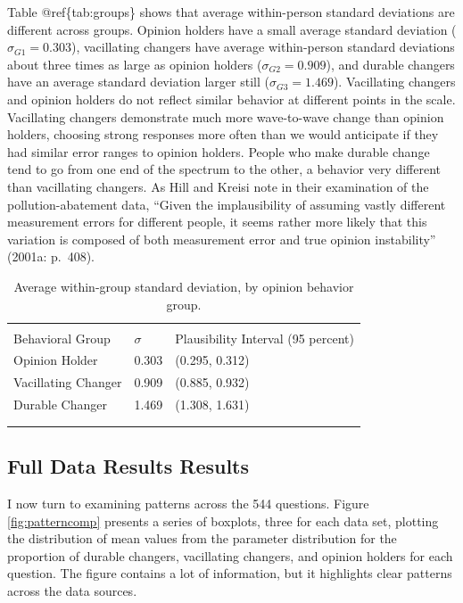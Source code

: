 \documentclass[12pt,]{article}
\begin{document}
Table @ref\{tab:groups\} shows that average within-person standard deviations are different across groups. Opinion holders have a small average standard deviation (\(\sigma_{G1} = 0.303\)), vacillating changers have average within-person standard deviations about three times as large as opinion holders (\(\sigma_{G2} = 0.909\)), and durable changers have an average standard deviation larger still (\(\sigma_{G3} = 1.469\)). Vacillating changers and opinion holders do not reflect similar behavior at different points in the scale. Vacillating changers demonstrate much more wave-to-wave change than opinion holders, choosing strong responses more often than we would anticipate if they had similar error ranges to opinion holders. People who make durable change tend to go from one end of the spectrum to the other, a behavior very different than vacillating changers. As Hill and Kreisi note in their examination of the pollution-abatement data, ``Given the implausibility of assuming vastly different measurement errors for different people, it seems rather more likely that this variation is composed of both measurement error and true opinion instability'' (2001a: p.~408).

\begin{table}[!htbp] \centering
  \caption{Average within-group standard deviation, by opinion behavior group.}
  \label{tab:groups}
\begin{tabular}{@{}l l l@{}}
\\[-1.8ex]\hline 
\hline \\[-1.8ex] 
Behavioral Group & $\sigma$ & Plausibility Interval (95 percent) \\
\hline
Opinion Holder & 0.303 & (0.295, 0.312)\\
Vacillating Changer & 0.909 & (0.885, 0.932)\\
Durable Changer & 1.469 & (1.308, 1.631)\\
\\[-1.8ex]\hline 
\hline \\[-1.8ex] 
\end{tabular}
\end{table}

\hypertarget{full-data-results-results}{%
\subsection{Full Data Results Results}\label{full-data-results-results}}

I now turn to examining patterns across the 544 questions. Figure \ref{fig:patterncomp} presents a series of boxplots, three for each data set, plotting the distribution of mean values from the parameter distribution for the proportion of durable changers, vacillating changers, and opinion holders for each question. The figure contains a lot of information, but it highlights clear patterns across the data sources.
\end{document}
